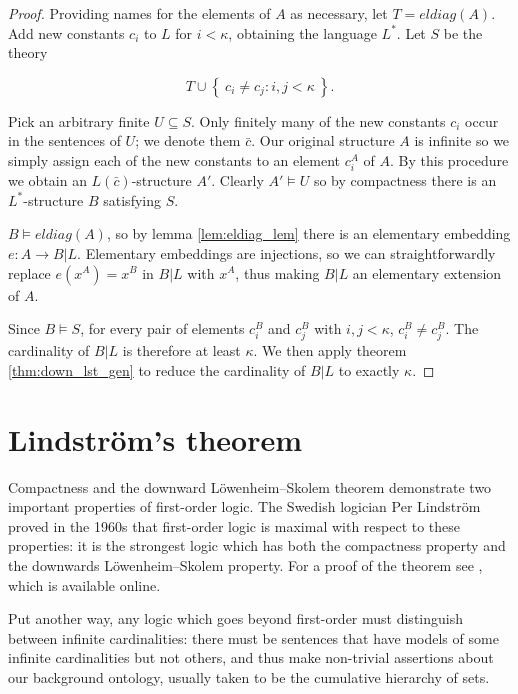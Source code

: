 \documentclass[10pt, a4paper, oneside]{article}
\theoremstyle{definition}
\theoremstyle{remark}
\theoremstyle{plain}
\theoremstyle{plain}
\begin{document}
\begin{proof}
    Providing names for the elements of $A$ as necessary, let $T = eldiag(A)$.
    Add new constants $c_i$ to $L$ for $i < \kappa$, obtaining the language
    $L^*$. Let $S$ be the theory
    
    \begin{displaymath}
        T \cup \left\{\ c_i \neq c_j : i, j < \kappa\ \right\}.
    \end{displaymath}
    
    Pick an arbitrary finite $U \subseteq S$. Only finitely many of the new
    constants $c_i$ occur in the sentences of $U$; we denote them $\bar{c}$. Our
    original structure $A$ is infinite so we simply assign each of the new
    constants to an element $c^A_i$ of $A$. By this procedure we obtain an
    $L(\bar{c})$-structure $A'$. Clearly $A' \models U$ so by compactness there
    is an $L^*$-structure $B$ satisfying $S$.
    
    $B \models eldiag(A)$, so by lemma \ref{lem:eldiag_lem} there is an
    elementary embedding $e : A \rightarrow B | L$. Elementary embeddings are
    injections, so we can straightforwardly replace $e(x^A) = x^B$ in $B|L$ with
    $x^A$, thus making $B|L$ an elementary extension of $A$.
    
    Since $B \models S$, for every pair of elements $c^B_i$ and $c^B_j$ with
    $i, j < \kappa$, $c^B_i \neq c^B_j$. The cardinality of $B | L$ is therefore
    at least $\kappa$. We then apply theorem \ref{thm:down_lst_gen} to reduce
    the cardinality of $B|L$ to exactly $\kappa$.
\end{proof}

\section{Lindström's theorem}

Compactness and the downward Löwenheim--Skolem theorem demonstrate two
important properties of first-order logic. The Swedish logician Per Lindström
proved in the 1960s that first-order logic is maximal with respect to these
properties: it is the strongest logic which has both the compactness property
and the downwards Löwenheim--Skolem property. For a proof of the theorem see
\citet{vaananen2010}, which is available online.

Put another way, any logic which goes beyond first-order must distinguish
between infinite cardinalities: there must be sentences that have models of
some infinite cardinalities but not others, and thus make non-trivial assertions
about our background ontology, usually taken to be the cumulative hierarchy of
sets.
\end{document}
